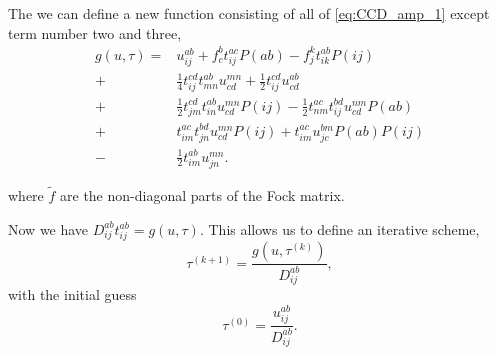 \documentclass[
    a4paper, aps, twocolumn, floatfix, superscriptaddress,
    nofootinbib]{revtex4-1}
\newcommand{\1}{\mathds{1}}
\begin{document}
        The we can define a new function consisting of all of \autoref{eq:CCD_amp_1}
        except term number two and three,
        \begin{equation}
        \begin{aligned}
            g(u, \tau) =&
                    u^{ab}_{ij} + f^b_c t^{ac}_{ij}P(ab) - f^k_jt^{ab}_{ik}P(ij) \\
                 +& \frac{1}{4}t^{cd}_{ij} t^{ab}_{mn} u^{mn}_{cd} + \frac{1}{2}t^{cd}_{ij} u^{ab}_{cd} \\
                 +& \frac{1}{2}t^{cd}_{jm} t^{ab}_{in} u^{mn}_{cd} P(ij) - \frac{1}{2}t^{ac}_{nm} t^{bd}_{ij} u^{nm}_{cd} P(ab) \\
                 +& t^{ac}_{im} t^{bd}_{jn} u^{mn}_{cd} P(ij) + t^{ac}_{im} u^{bm}_{jc} P(ab) P(ij) \\
                 -& \frac{1}{2}t^{ab}_{im} u^{mn}_{jn}.
        \end{aligned}
        \end{equation}

        where $\tilde{f}$ are the non-diagonal parts of the Fock matrix.

        Now we have $D_{ij}^{ab}t_{ij}^{ab} = g(u, \tau)$.
        This allows us to define an iterative scheme,
        \begin{equation}
            \tau^{(k + 1)} = \frac{g(u, \tau^{(k)})}{D_{ij}^{ab}},
            \label{eq:iterative_amplitude}
        \end{equation}
        with the initial guess
        \begin{equation}
            \tau^{(0)} = \frac{u_{ij}^{ab}}{D_{ij}^{ab}}.
        \end{equation}
\end{document}
